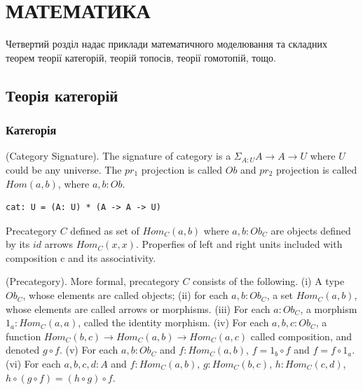 \chapter{МАТЕМАТИКА}

Четвертий розділ надає приклади математичного моделювання
та складних теорем теорії категорій, теорій топосів, теорії гомотопій, тощо.

\section{Теорія категорій}

\subsection{Категорія}

\begin{definition} (Category Signature).
The signature of category is
a $\Sigma_{A:U}A \rightarrow A \rightarrow U$ where $U$ could be any universe.
The $pr_1$ projection is called $Ob$ and $pr_2$ projection is
called $Hom(a,b)$, where $a,b:Ob$.
\begin{lstlisting}
cat: U = (A: U) * (A -> A -> U)
\end{lstlisting}
\end{definition}

Precategory $C$ defined as set of $Hom_C(a,b)$ where $a,b:Ob_C$
are objects defined by its $id$ arrows $Hom_C(x,x)$.
Properfies of left and right units included with composition c
and its associativity.

\begin{definition} (Precategory).
More formal, precategory $C$ consists of the following.
(i) A type $Ob_C$, whose elements are called objects;
(ii) for each $a,b: Ob_C$, a set $Hom_C(a,b)$, whose
elements are called arrows or morphisms.
(iii) For each $a: Ob_C$, a morphism $1_a : Hom_C(a,a)$,
called the identity morphism.
(iv) For each $a,b,c: Ob_C$, a function
$Hom_C(b,c) \rightarrow Hom_C(a,b) \rightarrow Hom_C(a,c)$
called composition, and denoted $g \circ f$.
(v) For each $a,b: Ob_C$ and $f: Hom_C(a,b)$,
$f = 1_b \circ f$ and $f = f \circ 1_a$.
(vi) For each $a,b,c,d: A$ and
$f: Hom_C(a,b)$, $g: Hom_C(b,c)$, $h: Hom_C(c,d)$,
$h \circ (g \circ f ) = (h \circ g) \circ f$.
\end{definition}

